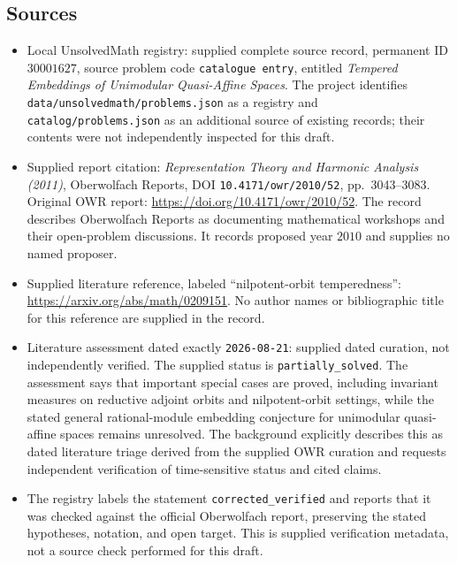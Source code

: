 \documentclass[11pt]{article}
\begin{document}
\subsection{Sources}
\begin{itemize}
\item Local UnsolvedMath registry: supplied complete source record, permanent ID \(30001627\), source problem code \texttt{catalogue entry}, entitled \emph{Tempered Embeddings of Unimodular Quasi-Affine Spaces}. The project identifies \texttt{data/unsolvedmath/problems.json} as a registry and \texttt{catalog/problems.json} as an additional source of existing records; their contents were not independently inspected for this draft.
\item Supplied report citation: \emph{Representation Theory and Harmonic Analysis (2011)}, Oberwolfach Reports, DOI \texttt{10.4171/owr/2010/52}, pp.~3043--3083. Original OWR report: \url{https://doi.org/10.4171/owr/2010/52}. The record describes Oberwolfach Reports as documenting mathematical workshops and their open-problem discussions. It records proposed year \(2010\) and supplies no named proposer.
\item Supplied literature reference, labeled ``nilpotent-orbit temperedness'': \url{https://arxiv.org/abs/math/0209151}. No author names or bibliographic title for this reference are supplied in the record.
\item Literature assessment dated exactly \texttt{2026-08-21}: supplied dated curation, not independently verified. The supplied status is \texttt{partially\_solved}. The assessment says that important special cases are proved, including invariant measures on reductive adjoint orbits and nilpotent-orbit settings, while the stated general rational-module embedding conjecture for unimodular quasi-affine spaces remains unresolved. The background explicitly describes this as dated literature triage derived from the supplied OWR curation and requests independent verification of time-sensitive status and cited claims.
\item The registry labels the statement \texttt{corrected\_verified} and reports that it was checked against the official Oberwolfach report, preserving the stated hypotheses, notation, and open target. This is supplied verification metadata, not a source check performed for this draft.
\end{itemize}
\end{document}
